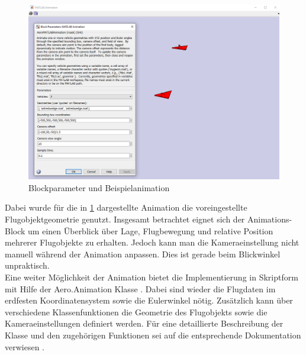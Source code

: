 \begin{figure}[h]
	\centering
	\includegraphics[width=\textwidth]{./Bilder/Visual_Sim6DoFBlockMenuBsp2.png}
	\caption{Blockparameter und Beispielanimation}
	\label{fig:Sim6DoFBlockMenuBsp}
\end{figure}
Dabei wurde für die in \ref{fig:Sim6DoFBlockMenuBsp} dargestellte Animation die voreingestellte Flugobjektgeometrie genutzt. Insgesamt betrachtet eignet sich der Animations-Block um einen Überblick über Lage, Flugbewegung und relative Position mehrerer Flugobjekte zu erhalten. Jedoch kann man die Kameraeinstellung nicht manuell während der Animation anpassen. Dies ist gerade beim Blickwinkel unpraktisch.\\


Eine weiter Möglichkeit der Animation bietet die Implementierung in Skriptform mit Hilfe der Aero.Animation Klasse \cite{AeroAniDoku}.
Dabei sind wieder die Flugdaten im erdfesten Koordinatensystem sowie die Eulerwinkel nötig. Zusätzlich kann über verschiedene Klassenfunktionen die Geometrie des Flugobjekts sowie die Kameraeinstellungen definiert werden. Für eine detaillierte Beschreibung der Klasse und den zugehörigen Funktionen sei auf die entsprechende Dokumentation verwiesen \cite{AeroAniDoku}.

